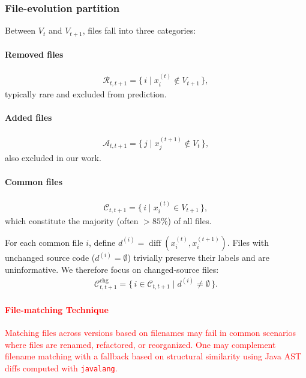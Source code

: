 \documentclass[authoryear,final,5p,times,twocolumn]{elsarticle}
\theoremstyle{plain}
\begin{document}
\subsubsection{File-evolution partition}
Between \(V_t\) and \(V_{t+1}\), files fall into three categories:

\paragraph*{Removed files}
\begin{align}
\mathcal{R}_{t,t+1}
= \{\, i \mid x^{(t)}_i \notin V_{t+1} \,\},
\end{align}
typically rare and excluded from prediction.

\paragraph*{Added files}
\begin{align}
\mathcal{A}_{t,t+1}
= \{\, j \mid x^{(t+1)}_j \notin V_t \,\},
\end{align}
also excluded in our work.

\paragraph*{Common files}
\begin{align}
\mathcal{C}_{t,t+1}
= \{\, i \mid x^{(t)}_i \in V_{t+1} \,\},
\end{align}
which constitute the majority (often \(>85\%\)) of all files. 

For each common file \(i\), define
$
d^{(i)} = \operatorname{diff}(x^{(t)}_i, x^{(t+1)}_i)
$. Files with unchanged source code (\(d^{(i)} = \emptyset\)) trivially preserve their labels and are uninformative. We therefore focus on changed-source files:
\begin{align}
\mathcal{C}^{\text{chg}}_{t,t+1}
= \{\, i \in \mathcal{C}_{t,t+1} \mid d^{(i)} \neq \emptyset \,\}.
\end{align}
\textcolor{red}{\paragraph{File-matching Technique} Matching files across versions based on filenames may fail in common scenarios where files are renamed, refactored, or reorganized. One may complement filename matching with a fallback based on structural similarity using Java AST diffs computed with \texttt{javalang}.}
\end{document}
